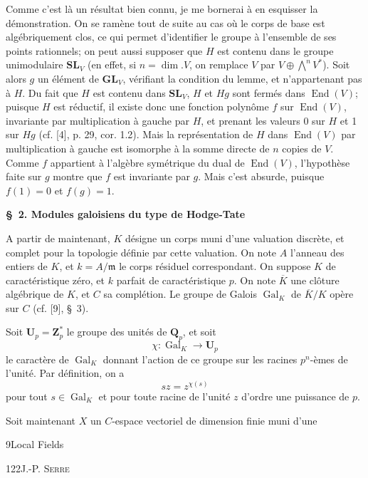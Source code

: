 Comme c'est là un résultat bien connu, je me bornerai à en esquisser la démonstration. On se ramène tout de suite au cas où le corps de base est algébriquement clos, ce qui permet d'identifier le groupe à l'ensemble de ses points rationnels; on peut aussi supposer que $H$ est contenu dans le groupe unimodulaire $\mathbf{SL}_V$ (en effet, si $n=\dim.V$, on remplace $V$ par $V\oplus\bigwedge^n V^*$). Soit alors $g$ un élément de $\mathbf{GL}_V$, vérifiant la condition du lemme, et n'appartenant pas à $H$. Du fait que $H$ est contenu dans $\mathbf{SL}_V$, $H$ et $Hg$ sont fermés dans $\operatorname{End}(V)$; puisque $H$ est réductif, il existe donc une fonction polynôme $f$ sur $\operatorname{End}(V)$, invariante par multiplication à gauche par $H$, et prenant les valeurs 0 sur $H$ et 1 sur $Hg$ (cf. [4], p. 29, cor. 1.2). Mais la représentation de $H$ dans $\operatorname{End}(V)$ par multiplication à gauche est isomorphe à la somme directe de $n$ copies de $V$. Comme $f$ appartient à l'algèbre symétrique du dual de $\operatorname{End}(V)$, l'hypothèse faite sur $g$ montre que $f$ est invariante par $g$. Mais c'est absurde, puisque $f(1)=0$ et $f(g)=1$.

\begin{center}\textbf{\S\ 2. Modules galoisiens du type de Hodge-Tate}\end{center}

A partir de maintenant, $K$ désigne un corps muni d'une valuation discrète, et complet pour la topologie définie par cette valuation. On note $A$ l'anneau des entiers de $K$, et $k=A/\mathfrak m$ le corps résiduel correspondant. On suppose $K$ de caractéristique zéro, et $k$ parfait de caractéristique $p$. On note $\overline K$ une clôture algébrique de $K$, et $C$ sa complétion. Le groupe de Galois $\operatorname{Gal}_K$ de $\overline K/K$ opère sur $C$ (cf. [9], \S\ 3).

Soit $\mathbf U_p=\mathbf Z_p^*$ le groupe des unités de $\mathbf Q_p$, et soit
\[
\chi:\operatorname{Gal}_K\to\mathbf U_p
\]
le caractère de $\operatorname{Gal}_K$ donnant l'action de ce groupe sur les racines $p^n$-èmes de l'unité. Par définition, on a
\[
sz=z^{\chi(s)}
\]
pour tout $s\in\operatorname{Gal}_K$ et pour toute racine de l'unité $z$ d'ordre une puissance de $p$.

Soit maintenant $X$ un $C$-espace vectoriel de dimension finie muni d'une

9\qquad Local Fields

122\hfill J.-P. \textsc{Serre}

